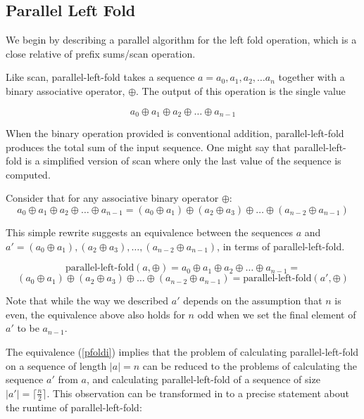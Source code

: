 \documentclass[12pt,twoside]{reedthesis}
\begin{document}
\vspace{1pc}
\subsection{Parallel Left Fold}
We begin by describing a parallel algorithm for the left fold operation, which is a close relative of prefix sums/scan operation.

Like scan, parallel-left-fold takes a sequence $a = a_0, a_1, a_2, \ldots a_n$ together with a binary associative operator, $\oplus$. The output of this operation is the single value

$$a_0 \oplus a_1 \oplus a_2 \oplus \ldots \oplus a_{n-1}$$

When the binary operation provided is conventional addition, parallel-left-fold produces the total sum of the input sequence. One might say that parallel-left-fold is a simplified version of scan where only the last value of the sequence is computed.
\vspace{.5pc}

Consider that for any associative binary operator $\oplus$:
\begin{equation}
a_0 \oplus a_1 \oplus a_2 \oplus \ldots \oplus a_{n-1} = (a_0 \oplus a_1) \oplus (a_2 \oplus a_3) \oplus \ldots \oplus (a_{n-2} \oplus a_{n-1}) \label{assocident}
\end{equation}

This simple rewrite suggests an equivalence between the sequences $a$ and $a' = (a_0 \oplus a_1), (a_2 \oplus a_3), \ldots, (a_{n-2} \oplus a_{n-1})$, in terms of parallel-left-fold.

$$
\mbox{parallel-left-fold}(a, \oplus) = 
a_0 \oplus a_1 \oplus a_2 \oplus \ldots \oplus a_{n-1} =
$$
\begin{equation}
(a_0 \oplus a_1) \oplus (a_2 \oplus a_3) \oplus \ldots \oplus (a_{n-2} \oplus a_{n-1}) = 
\mbox{parallel-left-fold}(a', \oplus)
\label{pfoldi}
\end{equation}

Note that while the way we described $a'$ depends on the assumption that $n$ is even, the equivalence above also holds for $n$ odd when we set the final element of $a'$ to be $a_{n-1}$.
\vspace{1pc}

The equivalence (\ref{pfoldi}) implies that the problem of calculating parallel-left-fold on a sequence of length $|a| = n$ can be reduced to the problems of calculating the sequence $a'$ from $a$, and calculating parallel-left-fold of a sequence of size $|a'| = \lceil \frac{n}{2} \rceil$. This observation can be transformed in to a precise statement about the runtime of parallel-left-fold:
\end{document}
